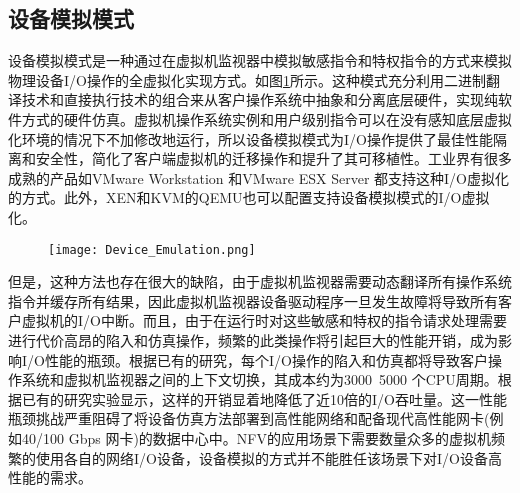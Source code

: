 \subsection{设备模拟模式}
设备模拟模式是一种通过在虚拟机监视器中模拟敏感指令和特权指令的方式来模拟物理设备I/O操作的全虚拟化实现方式。如图\ref{fig:device_emu}所示。这种模式充分利用二进制翻译技术和直接执行技术的组合来从客户操作系统中抽象和分离底层硬件，实现纯软件方式的硬件仿真。虚拟机操作系统实例和用户级别指令可以在没有感知底层虚拟化环境的情况下不加修改地运行，所以设备模拟模式为I/O操作提供了最佳性能隔离和安全性，简化了客户端虚拟机的迁移操作和提升了其可移植性。工业界有很多成熟的产品如VMware Workstation\citen{} 和VMware ESX Server\citen{} 都支持这种I/O虚拟化的方式。此外，XEN和KVM的QEMU也可以配置支持设备模拟模式的I/O虚拟化。
\begin{figure}[!htp]
	\label{fig:device_emu}
	\centering
	\texttt{[image: Device\_Emulation.png]}
\end{figure}
但是，这种方法也存在很大的缺陷，由于虚拟机监视器需要动态翻译所有操作系统指令并缓存所有结果，因此虚拟机监视器设备驱动程序一旦发生故障将导致所有客户虚拟机的I/O中断。而且，由于在运行时对这些敏感和特权的指令请求处理需要进行代价高昂的陷入和仿真操作，频繁的此类操作将引起巨大的性能开销，成为影响I/O性能的瓶颈。根据已有的研究，每个I/O操作的陷入和仿真都将导致客户操作系统和虚拟机监视器之间的上下文切换，其成本约为3000~5000 个CPU周期\citen{}。根据已有的研究实验显示，这样的开销显着地降低了近10倍的I/O吞吐量。这一性能瓶颈挑战严重阻碍了将设备仿真方法部署到高性能网络和配备现代高性能网卡(例如40/100 Gbps 网卡)的数据中心中。NFV的应用场景下需要数量众多的虚拟机频繁的使用各自的网络I/O设备，设备模拟的方式并不能胜任该场景下对I/O设备高性能的需求。

